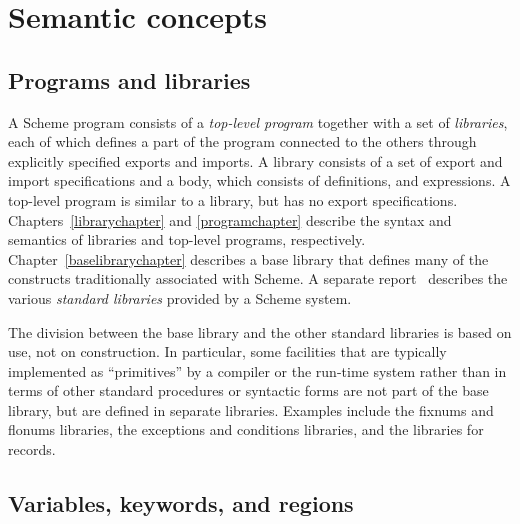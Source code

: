\chapter{Semantic concepts}
\label{basicchapter}

\section{Programs and libraries}

A Scheme program consists of a \textit{top-level program}
together with a set of \textit{libraries}, each
of which defines a part of the program connected to the others through
explicitly specified exports and imports.  A library consists of a set
of export and import specifications and a body, which consists of
definitions, and expressions.
A top-level program is similar to a library, but
has no export specifications.
Chapters~\ref{librarychapter} and \ref{programchapter}
describe the syntax and semantics of libraries and top-level programs,
respectively. 
Chapter~\ref{baselibrarychapter} describes a base
library that defines many of the constructs traditionally associated with
Scheme.
A separate report~\cite{R6RS-libraries}
describes the various \textit{standard libraries} provided by a Scheme system.

The division between the base library and the other standard libraries is
based on use, not on construction.  In particular, some facilities
that are typically implemented as ``primitives'' by a compiler or the
run-time system rather than in terms of other standard procedures
 or syntactic forms are not part of the base library, but are defined in
separate libraries.  Examples include the fixnums and flonums libraries,
the exceptions and conditions libraries, and the libraries for
records.

\section{Variables, keywords, and regions}
\label{specialformsection}
\label{variablesection}


